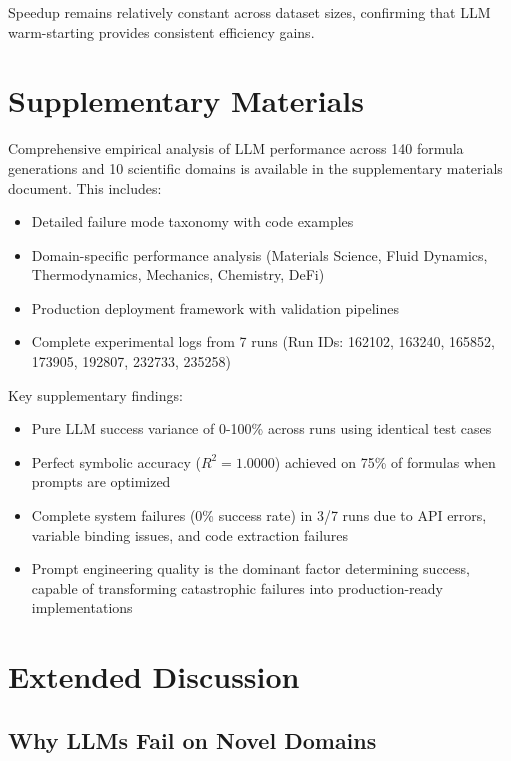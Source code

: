 \documentclass[twoside,11pt]{article}
\begin{document}
Speedup remains relatively constant across dataset sizes, confirming that LLM warm-starting provides consistent efficiency gains.


\section*{Supplementary Materials}

Comprehensive empirical analysis of LLM performance across 140 formula generations and 10 scientific domains is available in the supplementary materials document. This includes:

\begin{itemize}
\item Detailed failure mode taxonomy with code examples
\item Domain-specific performance analysis (Materials Science, Fluid Dynamics, Thermodynamics, Mechanics, Chemistry, DeFi)
\item Production deployment framework with validation pipelines
\item Complete experimental logs from 7 runs (Run IDs: 162102, 163240, 165852, 173905, 192807, 232733, 235258)
\end{itemize}

Key supplementary findings:
\begin{itemize}
\item Pure LLM success variance of 0-100\% across runs using identical test cases
\item Perfect symbolic accuracy ($R^2 = 1.0000$) achieved on 75\% of formulas when prompts are optimized
\item Complete system failures (0\% success rate) in 3/7 runs due to API errors, variable binding issues, and code extraction failures
\item Prompt engineering quality is the dominant factor determining success, capable of transforming catastrophic failures into production-ready implementations
\end{itemize}

\section{Extended Discussion}
\label{app:extended_discussion}

\subsection{Why LLMs Fail on Novel Domains}
\end{document}
